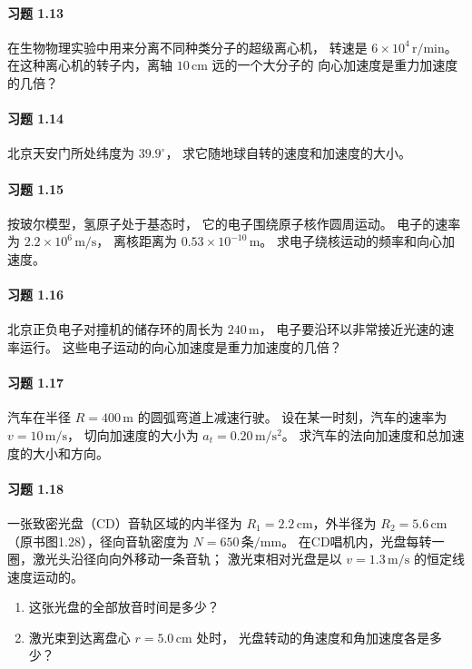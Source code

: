 \paragraph{习题 1.13}
在生物物理实验中用来分离不同种类分子的超级离心机，
转速是 \(6\times10^4\,\mathrm{r/min}\)。
在这种离心机的转子内，离轴 \(10\,\mathrm{cm}\) 远的一个大分子的
向心加速度是重力加速度的几倍？

\paragraph{习题 1.14}
北京天安门所处纬度为 \(39.9^\circ\)，
求它随地球自转的速度和加速度的大小。

\paragraph{习题 1.15}
按玻尔模型，氢原子处于基态时，
它的电子围绕原子核作圆周运动。
电子的速率为 \(2.2\times10^6\,\mathrm{m/s}\)，
离核距离为 \(0.53\times10^{-10}\,\mathrm{m}\)。
求电子绕核运动的频率和向心加速度。

\paragraph{习题 1.16}
北京正负电子对撞机的储存环的周长为 \(240\,\mathrm{m}\)，
电子要沿环以非常接近光速的速率运行。
这些电子运动的向心加速度是重力加速度的几倍？

\paragraph{习题 1.17}
汽车在半径 \(R=400\,\mathrm{m}\) 的圆弧弯道上减速行驶。
设在某一时刻，汽车的速率为 \(v=10\,\mathrm{m/s}\)，
切向加速度的大小为 \(a_t=0.20\,\mathrm{m/s^2}\)。
求汽车的法向加速度和总加速度的大小和方向。

\paragraph{习题 1.18}
一张致密光盘（CD）音轨区域的内半径为
\(R_1=2.2\,\mathrm{cm}\)，外半径为 \(R_2=5.6\,\mathrm{cm}\)
（原书图1.28），径向音轨密度为 \(N=650\,\text{条/mm}\)。
在CD唱机内，光盘每转一圈，激光头沿径向向外移动一条音轨；
激光束相对光盘是以 \(v=1.3\,\mathrm{m/s}\) 的恒定线速度运动的。
\begin{enumerate}
\item 这张光盘的全部放音时间是多少？
\item 激光束到达离盘心 \(r=5.0\,\mathrm{cm}\) 处时，
光盘转动的角速度和角加速度各是多少？
\end{enumerate}

